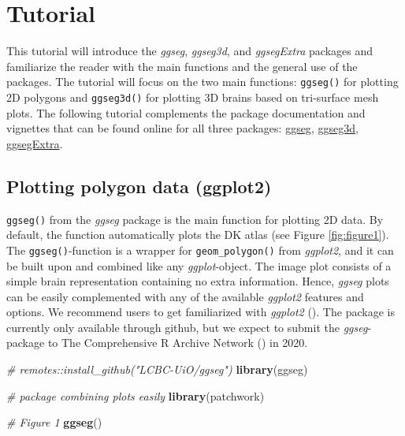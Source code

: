 \documentclass[fleqn,10pt]{wlpeerj} %
\newenvironment{Shaded}{\begin{snugshade}}{\end{snugshade}}
\newcommand{\CommentTok}[1]{\textcolor[rgb]{0.56,0.35,0.01}{\textit{#1}}}
\newcommand{\KeywordTok}[1]{\textcolor[rgb]{0.13,0.29,0.53}{\textbf{#1}}}
\newcommand{\NormalTok}[1]{#1}
\begin{document}
\hypertarget{tutorial}{%
\section{Tutorial}\label{tutorial}}

This tutorial will introduce the \emph{ggseg}, \emph{ggseg3d}, and \emph{ggsegExtra} packages and familiarize the reader with the main functions and the general use of the packages.
The tutorial will focus on the two main functions: \texttt{ggseg()} for plotting 2D polygons and \texttt{ggseg3d()} for plotting 3D brains based on tri-surface mesh plots.
The following tutorial complements the package documentation and vignettes that can be found online for all three packages: \href{https://lcbc-uio.github.io/ggseg}{ggseg}, \href{https://lcbc-uio.github.io/ggseg3d}{ggseg3d}, \href{https://lcbc-uio.github.io/ggsegExtra}{ggsegExtra}.

\hypertarget{plotting-polygon-data-ggplot2}{%
\subsection{Plotting polygon data (ggplot2)}\label{plotting-polygon-data-ggplot2}}

\texttt{ggseg()} from the \emph{ggseg} package is the main function for plotting 2D data.
By default, the function automatically plots the DK atlas (see Figure \ref{fig:figure1}).
The \texttt{ggseg()}-function is a wrapper for \texttt{geom\_polygon()} from \emph{ggplot2}, and it can be built upon and combined like any \emph{ggplot}-object.
The image plot consists of a simple brain representation containing no extra information.
Hence, \emph{ggseg} plots can be easily complemented with any of the available \emph{ggplot2} features and options.
We recommend users to get familiarized with \emph{ggplot2} (\citet{ggplot}).
The package is currently only available through github, but we expect to submit the \emph{ggseg}-package to The Comprehensive R Archive Network (\citet{cran}) in 2020.

\begin{Shaded}
\begin{Highlighting}[]
\CommentTok{# remotes::install_github("LCBC-UiO/ggseg")}
\KeywordTok{library}\NormalTok{(ggseg)}

\CommentTok{# package combining plots easily}
\KeywordTok{library}\NormalTok{(patchwork)}

\CommentTok{# Figure 1}
\KeywordTok{ggseg}\NormalTok{()}
\end{Highlighting}
\end{Shaded}
\end{document}
